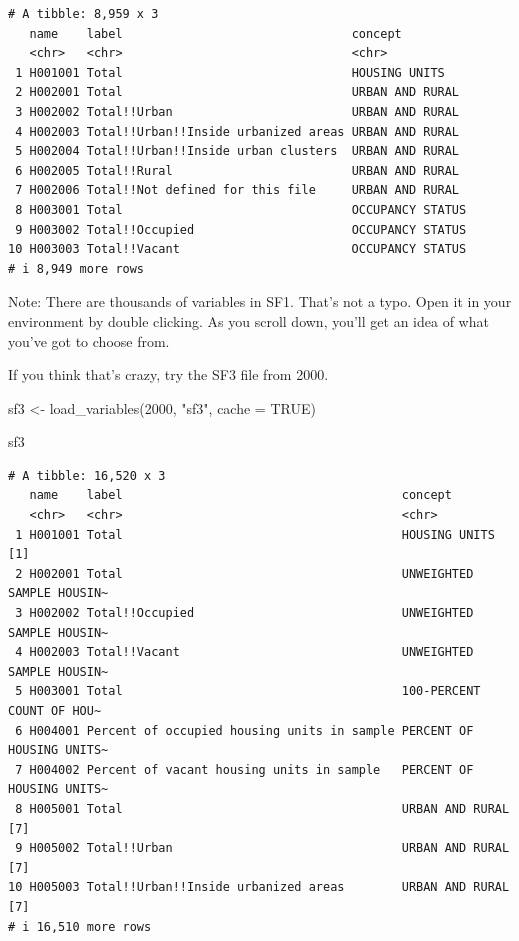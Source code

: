 \documentclass[
  letterpaper,
  DIV=11,
  numbers=noendperiod]{scrreprt}
\newenvironment{Shaded}{\begin{snugshade}}{\end{snugshade}}
\newcommand{\AttributeTok}[1]{\textcolor[rgb]{0.40,0.45,0.13}{#1}}
\newcommand{\ConstantTok}[1]{\textcolor[rgb]{0.56,0.35,0.01}{#1}}
\newcommand{\DecValTok}[1]{\textcolor[rgb]{0.68,0.00,0.00}{#1}}
\newcommand{\FunctionTok}[1]{\textcolor[rgb]{0.28,0.35,0.67}{#1}}
\newcommand{\NormalTok}[1]{\textcolor[rgb]{0.00,0.23,0.31}{#1}}
\newcommand{\OtherTok}[1]{\textcolor[rgb]{0.00,0.23,0.31}{#1}}
\newcommand{\StringTok}[1]{\textcolor[rgb]{0.13,0.47,0.30}{#1}}
\begin{document}
\begin{verbatim}
# A tibble: 8,959 x 3
   name    label                                concept         
   <chr>   <chr>                                <chr>           
 1 H001001 Total                                HOUSING UNITS   
 2 H002001 Total                                URBAN AND RURAL 
 3 H002002 Total!!Urban                         URBAN AND RURAL 
 4 H002003 Total!!Urban!!Inside urbanized areas URBAN AND RURAL 
 5 H002004 Total!!Urban!!Inside urban clusters  URBAN AND RURAL 
 6 H002005 Total!!Rural                         URBAN AND RURAL 
 7 H002006 Total!!Not defined for this file     URBAN AND RURAL 
 8 H003001 Total                                OCCUPANCY STATUS
 9 H003002 Total!!Occupied                      OCCUPANCY STATUS
10 H003003 Total!!Vacant                        OCCUPANCY STATUS
# i 8,949 more rows
\end{verbatim}

Note: There are thousands of variables in SF1. That's not a typo. Open
it in your environment by double clicking. As you scroll down, you'll
get an idea of what you've got to choose from.

If you think that's crazy, try the SF3 file from 2000.

\begin{Shaded}
\begin{Highlighting}[]
\NormalTok{sf3 }\OtherTok{\textless{}{-}} \FunctionTok{load\_variables}\NormalTok{(}\DecValTok{2000}\NormalTok{, }\StringTok{"sf3"}\NormalTok{, }\AttributeTok{cache =} \ConstantTok{TRUE}\NormalTok{)}

\NormalTok{sf3}
\end{Highlighting}
\end{Shaded}

\begin{verbatim}
# A tibble: 16,520 x 3
   name    label                                       concept                  
   <chr>   <chr>                                       <chr>                    
 1 H001001 Total                                       HOUSING UNITS [1]        
 2 H002001 Total                                       UNWEIGHTED SAMPLE HOUSIN~
 3 H002002 Total!!Occupied                             UNWEIGHTED SAMPLE HOUSIN~
 4 H002003 Total!!Vacant                               UNWEIGHTED SAMPLE HOUSIN~
 5 H003001 Total                                       100-PERCENT COUNT OF HOU~
 6 H004001 Percent of occupied housing units in sample PERCENT OF HOUSING UNITS~
 7 H004002 Percent of vacant housing units in sample   PERCENT OF HOUSING UNITS~
 8 H005001 Total                                       URBAN AND RURAL [7]      
 9 H005002 Total!!Urban                                URBAN AND RURAL [7]      
10 H005003 Total!!Urban!!Inside urbanized areas        URBAN AND RURAL [7]      
# i 16,510 more rows
\end{verbatim}
\end{document}

